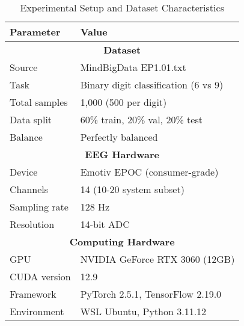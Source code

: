 \begin{table}[htbp]
\centering
\caption{Experimental Setup and Dataset Characteristics}
\label{tab:experimental_setup}
\begin{tabular}{|l|l|}
\hline
\textbf{Parameter} & \textbf{Value} \\
\hline
\multicolumn{2}{|c|}{\textbf{Dataset}} \\
\hline
Source & MindBigData EP1.01.txt \\
Task & Binary digit classification (6 vs 9) \\
Total samples & 1,000 (500 per digit) \\
Data split & 60\% train, 20\% val, 20\% test \\
Balance & Perfectly balanced \\
\hline
\multicolumn{2}{|c|}{\textbf{EEG Hardware}} \\
\hline
Device & Emotiv EPOC (consumer-grade) \\
Channels & 14 (10-20 system subset) \\
Sampling rate & 128 Hz \\
Resolution & 14-bit ADC \\
\hline
\multicolumn{2}{|c|}{\textbf{Computing Hardware}} \\
\hline
GPU & NVIDIA GeForce RTX 3060 (12GB) \\
CUDA version & 12.9 \\
Framework & PyTorch 2.5.1, TensorFlow 2.19.0 \\
Environment & WSL Ubuntu, Python 3.11.12 \\
\hline
\end{tabular}
\end{table}
